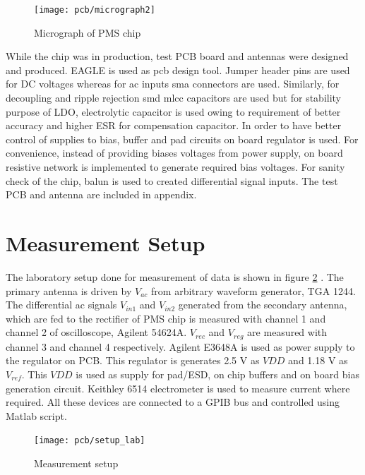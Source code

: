 \documentclass[12pt,a4paper,UKenglish]{report}
\begin{document}
\begin{figure} [!htb]
  \centering
  \texttt{[image: pcb/micrograph2]} 
 \caption{Micrograph of PMS chip} 
\label{fig:micrograph} 
\end{figure}


While the chip was in production, test PCB board and antennas were designed and produced. EAGLE is used as  \acrshort{pcb} design tool. Jumper header pins are used for DC voltages whereas for ac inputs \acrshort{sma} connectors are used. Similarly, for decoupling and ripple rejection \acrshort{smd} \acrshort{mlcc} capacitors are used but  for stability purpose of LDO, electrolytic capacitor is used owing to requirement of better accuracy and higher ESR for compensation capacitor.  In order to have better control of supplies to bias, buffer and pad circuits on board regulator is used. For convenience, instead of providing biases voltages from power supply, on board resistive network is implemented to generate required bias voltages. For sanity check of the chip, balun is used to created differential signal inputs. The test PCB and antenna are included in appendix.\\

\section{Measurement Setup} %

The laboratory setup done for measurement of data is shown in figure \ref{fig:lab_setup} . The primary antenna is driven by $V_{ac}$ 
from arbitrary waveform generator, TGA 1244. The differential ac signals  $V_{in1}$ and $V_{in2}$ generated from the 
secondary antenna, which are fed to the rectifier of PMS chip is measured with channel 1 and channel 2 of oscilloscope,
Agilent 54624A. $V_{rec}$ and $V_{reg}$ are measured with channel 3 and channel 4 respectively. Agilent E3648A is used as 
power supply to the regulator on PCB. This regulator is generates 2.5 V as $VDD$ and 1.18 V as $V_{ref}$. This $VDD$ is 
used as supply for pad/ESD, on chip buffers and on board bias generation circuit. Keithley 6514 electrometer is used to 
measure current where required. All these devices are connected to a GPIB bus and controlled using Matlab script.

\begin{figure} [H]
  \centering
  \texttt{[image: pcb/setup\_lab]} 
 \caption{Measurement setup} 
\label{fig:lab_setup} 
\end{figure}
\end{document}
